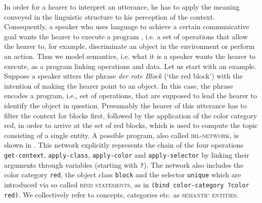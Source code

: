 In order for a hearer to interpret an utterance, he has to apply the 
meaning conveyed in the linguistic structure to his perception of 
the context. Consequently, a speaker who 
uses language to achieve a certain communicative goal wants 
the hearer to execute a program \citep{johnson1977procedural}, 
i.e. a set of operations that allow the hearer to, for example, discriminate 
an object in the environment or perform an action. Thus we model semantics, 
i.e. what it is a speaker wants the hearer to execute, as a 
program linking operations and data.  Let us start with an example. 
Suppose a speaker utters the phrase \textit{der rote Block} (`the red block') with the intention 
of making the hearer point to an object. In this case, the phrase 
encodes a program, i.e., set of operations, that are supposed to lead 
the hearer to identify the object in question. Presumably
the hearer of this utterance has to filter the context for blocks first, 
followed by the application of the color category
red, in order to arrive at the set of red blocks, which is used to 
compute the topic consisting of a single entity. A possible program, 
also called \textsc{irl-network}, is shown in .
This network explicitly represents the chain of the four operations {\footnotesize\tt get-context},
{\footnotesize\tt apply-class}, {\footnotesize\tt apply-color} and {\footnotesize\tt apply-selector}
by linking their arguments through variables 
(starting with {\footnotesize\tt ?}). The network also 
includes the color category {\footnotesize\tt red}, 
the object class {\footnotesize\tt block} and the selector 
{\footnotesize\tt unique} which are introduced via so called 
\textsc{bind statements}, as in 
{\footnotesize\tt (bind color-category ?color red)}. We collectively
refer to concepts, categories etc. as \textsc{semantic entities}.

